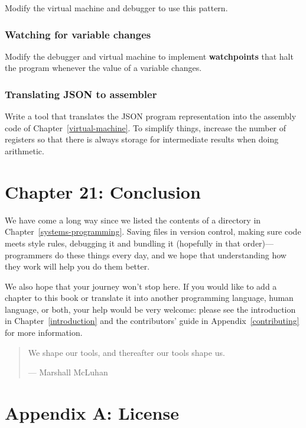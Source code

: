 \documentclass[krantzl]{krantz}
\newcommand{\appref}[1]{Appendix~\ref{#1}}
\newcommand{\chapref}[1]{Chapter~\ref{#1}}
\newcommand{\glossref}[1]{\textbf{#1}}
\newenvironment{callout}{\savenotes\begin{tBox}\begin{quotation}\toggletrue{inbox}\renewcommand{\thempfootnote}{\arabic{footnote}}}{\end{quotation}\vspace{\baselineskip}\end{tBox}\togglefalse{inbox}\spewnotes}
\begin{document}
Modify the virtual machine and debugger to use this pattern.

\subsection*{Watching for variable changes}


Modify the debugger and virtual machine to implement \glossref{watchpoints}
that halt the program whenever the value of a variable changes.

\subsection*{Translating JSON to assembler}


Write a tool that translates the JSON program representation
into the assembly code of \chapref{virtual-machine}.
To simplify things,
increase the number of registers so that
there is always storage for intermediate results
when doing arithmetic.

\chapter{Chapter 21: Conclusion}\label{conclusion}


We have come a long way since we listed the contents of a directory in \chapref{systems-programming}.
Saving files in version control,
making sure code meets style rules,
debugging it and bundling it (hopefully in that order)---programmers do these things every day,
and we hope that understanding how they work will help you do them better.


We also hope that your journey won't stop here.
If you would like to add a chapter to this book
or translate it into another programming language,
human language,
or both,
your help would be very welcome:
please see the introduction in \chapref{introduction}
and the contributors' guide in \appref{contributing} for more information.

\begin{callout}


We shape our tools, and thereafter our tools shape us.


--- Marshall McLuhan

\end{callout}


\appendix
\chapter{Appendix A: License}\label{license}
\end{document}
